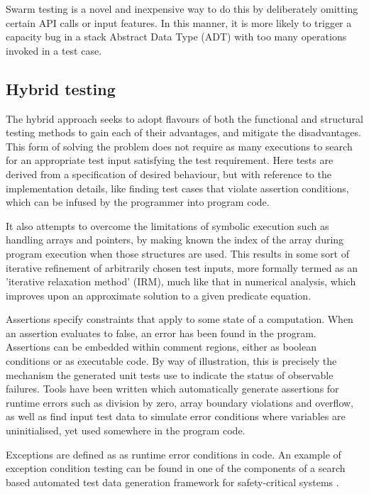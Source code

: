 \documentclass{icldt}
\numberwithin{equation}{section}       %
\begin{document}
Swarm testing is a novel and inexpensive way to do this by deliberately omitting certain API calls or input features. In this manner, it is more likely to trigger a capacity bug in a stack Abstract Data Type (ADT) with too many  operations invoked in a test case.

\subsection{Hybrid testing}
The hybrid approach seeks to adopt flavours of both the functional and structural testing methods to gain each of their advantages, and mitigate the disadvantages. This form of solving the problem does not require as many executions to search for an appropriate test input satisfying the test requirement. Here tests are derived from a specification of desired behaviour, but with reference to the implementation details, like finding test cases that violate assertion conditions, which can be infused by the programmer into program code.

It also attempts to overcome the limitations of symbolic execution such as handling arrays and pointers, by making known the index of the array during program execution when those structures are used. This results in some sort of iterative refinement of arbitrarily chosen test inputs, more formally termed as an 'iterative relaxation method' (IRM), much like that in numerical analysis, which improves upon an approximate solution to a given predicate equation.

Assertions specify constraints that apply to some state of a computation. When an assertion evaluates to false, an error has been found in the program. Assertions can be embedded within comment regions, either as boolean conditions or as executable code. By way of illustration, this is precisely the mechanism the generated unit tests use to indicate the status of observable failures. Tools have been written \cite{Korel1996} which automatically generate assertions for runtime errors such as division by zero, array boundary violations and overflow, as well as find input test data to simulate error conditions where variables are uninitialised, yet used somewhere in the program code.

Exceptions are defined as as runtime error conditions in code. An example of exception condition testing can be found in one of the components of a search based automated test data generation framework for safety-critical systems \cite{Tracey2002}.
\end{document}
